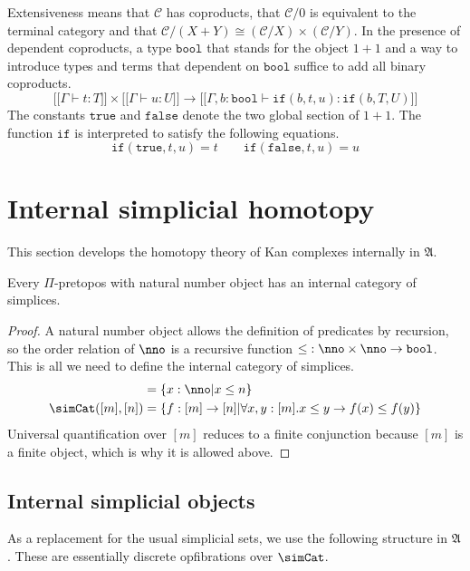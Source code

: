 \documentclass{tac}
\newcommand\cat\mathcal
\newcommand\set[1]{\left\{#1\right\}}
\newcommand\of{:}
\newcommand\db[1]{{[\![}#1{]\!]}}
\newcommand\true{\mathtt{true}}
\newcommand\false{\mathtt{false}}
\newcommand\bool{\mathtt{bool}}
\newcommand\ttif{\mathtt{if}}
\newcommand\ambient{\mathfrak A}
\begin{document}
Extensiveness means that $\cat C$ has coproducts, that $\cat C/0$ is equivalent to the terminal category and that $\cat C/(X+Y)\cong (\cat C/X)\times(\cat C/Y)$. In the presence of dependent coproducts, a type $\bool$ that stands for the object $1+1$ and a way to introduce types and terms that dependent on $\bool$ suffice to add all binary coproducts.
\[ \db{\Gamma\vdash t\of T}\times\db{\Gamma\vdash u\of U}\to\db{\Gamma,b\of\bool\vdash \ttif(b,t,u)\of\ttif(b,T,U)} \]
The constants $\true$ and $\false$ denote the two global section of $1+1$. The function $\ttif$ is interpreted to satisfy the following equations.
\[ \ttif(\true,t,u)=t\qquad\ttif(\false,t,u) = u\]


\section{Internal simplicial homotopy}
This section develops the homotopy theory of Kan complexes internally in $\ambient$.

\begin{proposition} Every $\Pi$-pretopos with natural number object has an internal category of simplices.\end{proposition}

\begin{proof} A natural number object allows the definition of predicates by recursion, so the order relation of $\nno$ is a recursive function $\mathord\leq\of\nno\times \nno \to \bool$. This is all we need to define the internal category of simplices.
\begin{align*}
[n] &= \set{x\of\nno\middle| x\leq n}\\
\simCat([m],[n]) &= \set{f\of[m]\to[n]\middle|\forall x,y\of [m].x\leq y\to f(x)\leq f(y)}
\end{align*}
Universal quantification over $[m]$ reduces to a finite conjunction because $[m]$ is a finite object, which is why it is allowed above. 
\end{proof}

\subsection{Internal simplicial objects}%
As a replacement for the usual simplicial sets, we use the following structure in $\ambient$. These are essentially discrete opfibrations over $\simCat$.
\end{document}

